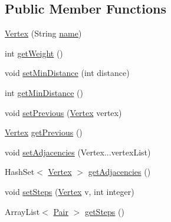 \subsection*{Public Member Functions}
\begin{DoxyCompactItemize}
\item 
\hyperlink{classmain_1_1java_1_1com_1_1company_1_1dijkstratest_1_1_vertex_a5c4df011dc24230cf67918f0d1c6b8f9}{Vertex} (String \hyperlink{classmain_1_1java_1_1com_1_1company_1_1dijkstratest_1_1_vertex_a2d3af47cee45105338487ebabe5d41af}{name})
\item 
int \hyperlink{classmain_1_1java_1_1com_1_1company_1_1dijkstratest_1_1_vertex_a37e1d362f47485e54f2e0a9cf56ac8c3}{get\-Weight} ()
\item 
void \hyperlink{classmain_1_1java_1_1com_1_1company_1_1dijkstratest_1_1_vertex_afe351de304209254ba6efdfdff362a27}{set\-Min\-Distance} (int distance)
\item 
int \hyperlink{classmain_1_1java_1_1com_1_1company_1_1dijkstratest_1_1_vertex_a0afd4e2eb4689ac8a4682b3c0f6e32d2}{get\-Min\-Distance} ()
\item 
void \hyperlink{classmain_1_1java_1_1com_1_1company_1_1dijkstratest_1_1_vertex_aec5f28d756beeb653fa52e733c2db139}{set\-Previous} (\hyperlink{classmain_1_1java_1_1com_1_1company_1_1dijkstratest_1_1_vertex}{Vertex} vertex)
\item 
\hyperlink{classmain_1_1java_1_1com_1_1company_1_1dijkstratest_1_1_vertex}{Vertex} \hyperlink{classmain_1_1java_1_1com_1_1company_1_1dijkstratest_1_1_vertex_a925585cbe8eb8ee5bf74b0cb58d388df}{get\-Previous} ()
\item 
void \hyperlink{classmain_1_1java_1_1com_1_1company_1_1dijkstratest_1_1_vertex_aec87153fc8c4f42b11c97c9566c9bfd9}{set\-Adjacencies} (Vertex...\-vertex\-List)
\item 
Hash\-Set$<$ \hyperlink{classmain_1_1java_1_1com_1_1company_1_1dijkstratest_1_1_vertex}{Vertex} $>$ \hyperlink{classmain_1_1java_1_1com_1_1company_1_1dijkstratest_1_1_vertex_ad4896ef0f829054d9a765436cdda7804}{get\-Adjacencies} ()
\item 
void \hyperlink{classmain_1_1java_1_1com_1_1company_1_1dijkstratest_1_1_vertex_ab66f86a13171527e0c762e90eef3dc5e}{set\-Steps} (\hyperlink{classmain_1_1java_1_1com_1_1company_1_1dijkstratest_1_1_vertex}{Vertex} v, int integer)
\item 
Array\-List$<$ \hyperlink{classmain_1_1java_1_1com_1_1company_1_1dijkstratest_1_1_pair}{Pair} $>$ \hyperlink{classmain_1_1java_1_1com_1_1company_1_1dijkstratest_1_1_vertex_aac9933bc854f3b3a427c7467824e29de}{get\-Steps} ()

\end{DoxyCompactItemize}
